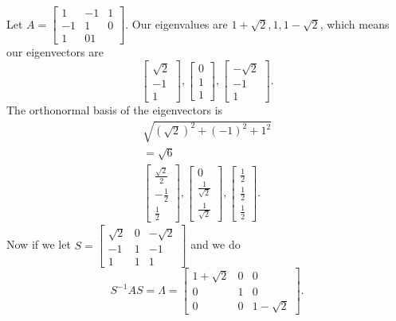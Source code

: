 \begin{eg}
  Let $A=\begin{bmatrix} 1&-1&1\\-1&1&0\\1&01 \end{bmatrix} $. Our eigenvalues are $1+\sqrt{2},1,1-\sqrt{2}  $, which means our eigenvectors are \[
  \begin{bmatrix} \sqrt{2} \\-1\\1 \end{bmatrix} ,\begin{bmatrix} 0\\1\\1 \end{bmatrix} ,\begin{bmatrix} -\sqrt{2} \\-1\\1 \end{bmatrix} 
  .\] 
  The orthonormal basis of the eigenvectors is 
  \begin{align*}
    \sqrt{(\sqrt{2} )^2+(-1)^2+1^2}\\
    =\sqrt{6}\\
    \begin{bmatrix} \frac{\sqrt{2} }{2}\\-\frac{1}{2}\\\frac{1}{2} \end{bmatrix} ,\begin{bmatrix} 0\\\frac{1}{\sqrt{2} }\\\frac{1}{\sqrt{2} } \end{bmatrix} ,\begin{bmatrix} \frac{1}{2}\\\frac{1}{2}\\\frac{1}{2} \end{bmatrix} 
  .\end{align*}
  Now if we let $S=\begin{bmatrix} \sqrt{2} &0&-\sqrt{2}\\-1&1&-1\\1&1&1  \end{bmatrix} $ and we do \[
  S^{-1}AS= \Lambda=\begin{bmatrix} 1+\sqrt{2}&0&0\\0&1&0\\0&0&1-\sqrt{2}   \end{bmatrix} 
  .\] 
\end{eg}
